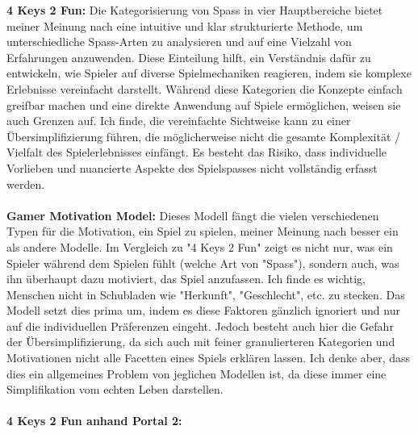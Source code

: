\documentclass{article}
\begin{document}
\textbf{4 Keys 2 Fun:} Die Kategorisierung von Spass in vier Hauptbereiche bietet meiner Meinung nach eine intuitive und klar
strukturierte Methode, um unterschiedliche Spass-Arten zu analysieren und auf eine Vielzahl von Erfahrungen anzuwenden.
Diese Einteilung hilft, ein Verständnis dafür zu entwickeln, wie Spieler auf diverse Spielmechaniken reagieren, indem
sie komplexe Erlebnisse vereinfacht darstellt. Während diese Kategorien die Konzepte einfach greifbar machen und eine direkte
Anwendung auf Spiele ermöglichen, weisen sie auch Grenzen auf. Ich finde, die vereinfachte Sichtweise kann zu einer
Übersimplifizierung führen, die möglicherweise nicht die gesamte Komplexität / Vielfalt des Spielerlebnisses einfängt.
Es besteht das Risiko, dass individuelle Vorlieben und nuancierte Aspekte des Spielspasses nicht vollständig erfasst werden.
\\
\\
\textbf{Gamer Motivation Model:} Dieses Modell fängt die vielen verschiedenen Typen für die Motivation, ein Spiel zu spielen,
meiner Meinung nach besser ein als andere Modelle. Im Vergleich zu "4 Keys 2 Fun" zeigt es nicht nur, was ein Spieler während dem
Spielen fühlt (welche Art von "Spass"), sondern auch, was ihn überhaupt dazu motiviert, das Spiel anzufassen. Ich finde es wichtig,
Menschen nicht in Schubladen wie "Herkunft", "Geschlecht", etc. zu stecken. Das Modell setzt dies prima um, indem es diese Faktoren
gänzlich ignoriert und nur auf die individuellen Präferenzen eingeht. Jedoch besteht auch hier die Gefahr der Übersimplifizierung,
da sich auch mit feiner granulierteren Kategorien und Motivationen nicht alle Facetten eines Spiels erklären lassen. Ich denke aber,
dass dies ein allgemeines Problem von jeglichen Modellen ist, da diese immer eine Simplifikation vom echten Leben darstellen.
\\
\\
\textbf{4 Keys 2 Fun anhand Portal 2:}
\end{document}
